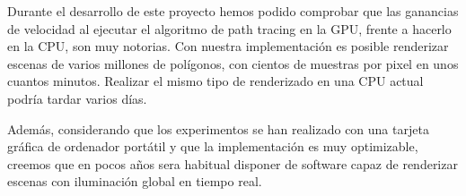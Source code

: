 Durante el desarrollo de este proyecto hemos podido comprobar que las ganancias de velocidad al ejecutar el algoritmo de path tracing en la GPU, frente a hacerlo en la CPU, son muy notorias. Con nuestra implementación es posible renderizar escenas de varios millones de polígonos, con cientos de muestras por pixel en unos cuantos minutos. Realizar el mismo tipo de renderizado en una CPU actual podría tardar varios días.

\medskip

Además, considerando que los experimentos se han realizado con una tarjeta gráfica de ordenador portátil y que la implementación es muy optimizable, creemos que en pocos años sera habitual disponer de software capaz de renderizar escenas con iluminación global en tiempo real.

\nocite{Ashikhmin2000}
\nocite{Cook1984}
\nocite{Dutre2003}
\nocite{Torrance1967}
\nocite{Torrance1967}
\nocite{Veach1995}
\nocite{Walter2007}